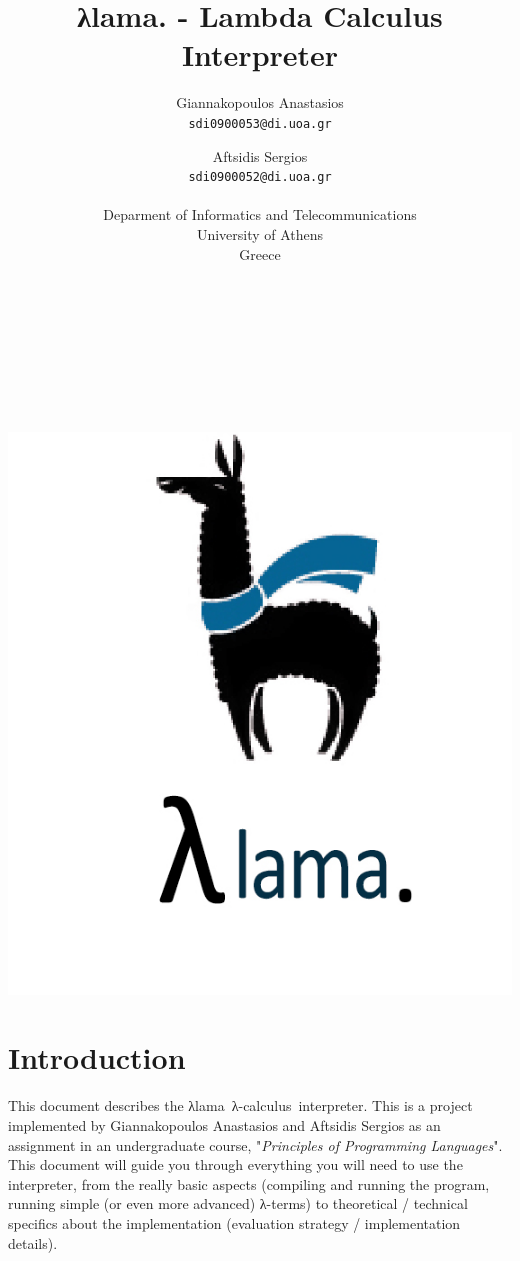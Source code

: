 \documentclass[a4paper]{article}
\title{\textgreek{λ}lama. - Lambda Calculus Interpreter}
\author{  
	Giannakopoulos Anastasios \\
  \texttt{sdi0900053@di.uoa.gr}
  \and
  Aftsidis Sergios\\
  \texttt{sdi0900052@di.uoa.gr}\\ \\
  Deparment of Informatics and Telecommunications\\
  University of Athens\\
  Greece
}
\newcommand{\lc}{\textgreek{λ}-calculus\ }
\newcommand{\la}{\textgreek{λ}}
\newcommand{\intr}{\textgreek{λ}lama\ }
\begin{document}
\maketitle
~\\
~\\ \\ \\ \\
\centerline{\includegraphics[scale=0.4]{llama_logo.jpg}}
\pagebreak
\tableofcontents
\pagebreak

\section{Introduction}
This document describes the \intr \lc interpreter. This is a project implemented by Giannakopoulos Anastasios and Aftsidis Sergios as an assignment in an undergraduate course, "\textit{Principles of Programming Languages}". This document will guide you through everything you will need to use the interpreter, from the really basic aspects  (compiling and running the program, running simple (or even more advanced) \la-terms) to theoretical / technical specifics about the implementation (evaluation strategy / implementation details).
\end{document}
